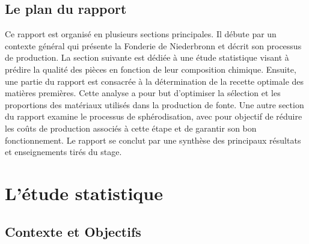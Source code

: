 \documentclass[12pt]{article}
\begin{document}
\subsection{Le plan du rapport}



 


Ce rapport est organisé en plusieurs sections principales. Il débute par 
un contexte général qui présente la Fonderie de Niederbronn et décrit 
son processus de production. La section suivante est dédiée à une étude 
statistique visant à prédire la qualité des pièces en fonction de leur 
composition chimique. Ensuite, une partie du rapport est consacrée à la 
détermination de la recette optimale des matières premières. Cette analyse 
a pour but d'optimiser la sélection et les proportions des matériaux 
utilisés dans la production de fonte. Une autre section du rapport examine 
le processus de sphérodisation, avec pour objectif de réduire les coûts 
de production associés à cette étape et de garantir son bon fonctionnement.
Le rapport se conclut par une synthèse des principaux résultats et 
enseignements tirés du stage.











\section{L'étude statistique}


\subsection{Contexte et Objectifs}
\end{document}
